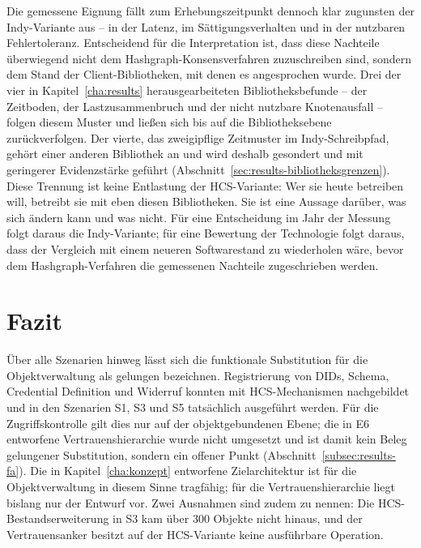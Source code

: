 Die gemessene Eignung fällt zum Erhebungszeitpunkt dennoch klar zugunsten der Indy-Variante aus -- in der Latenz, im Sättigungsverhalten und in der nutzbaren Fehlertoleranz. Entscheidend für die Interpretation ist, dass diese Nachteile überwiegend nicht dem Hashgraph-Konsensverfahren zuzuschreiben sind, sondern dem Stand der Client-Bibliotheken, mit denen es angesprochen wurde. Drei der vier in Kapitel~\ref{cha:results} herausgearbeiteten Bibliotheksbefunde -- der Zeitboden, der Lastzusammenbruch und der nicht nutzbare Knotenausfall -- folgen diesem Muster und ließen sich bis auf die Bibliotheksebene zurückverfolgen. Der vierte, das zweigipflige Zeitmuster im Indy-Schreibpfad, gehört einer anderen Bibliothek an und wird deshalb gesondert und mit geringerer Evidenzstärke geführt (Abschnitt~\ref{sec:results-bibliotheksgrenzen}). Diese Trennung ist keine Entlastung der HCS-Variante: Wer sie heute betreiben will, betreibt sie mit eben diesen Bibliotheken. Sie ist eine Aussage darüber, was sich ändern kann und was nicht. Für eine Entscheidung im Jahr der Messung folgt daraus die Indy-Variante; für eine Bewertung der Technologie folgt daraus, dass der Vergleich mit einem neueren Softwarestand zu wiederholen wäre, bevor dem Hashgraph-Verfahren die gemessenen Nachteile zugeschrieben werden.

\section{Fazit}
\label{sec:conclusion-fazit}

Über alle Szenarien hinweg lässt sich die funktionale Substitution für die Objektverwaltung als gelungen bezeichnen. Registrierung von DIDs, Schema, Credential Definition und Widerruf konnten mit HCS-Mechanismen nachgebildet und in den Szenarien S1, S3 und S5 tatsächlich ausgeführt werden. Für die Zugriffskontrolle gilt dies nur auf der objektgebundenen Ebene; die in E6 entworfene Vertrauenshierarchie wurde nicht umgesetzt und ist damit kein Beleg gelungener Substitution, sondern ein offener Punkt (Abschnitt~\ref{subsec:results-fa}). Die in Kapitel~\ref{cha:konzept} entworfene Zielarchitektur ist für die Objektverwaltung in diesem Sinne tragfähig; für die Vertrauenshierarchie liegt bislang nur der Entwurf vor. Zwei Ausnahmen sind zudem zu nennen: Die HCS-Bestandserweiterung in S3 kam über 300 Objekte nicht hinaus, und der Vertrauensanker besitzt auf der HCS-Variante keine ausführbare Operation.

